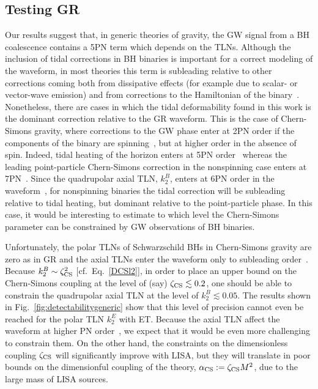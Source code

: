 \documentclass[aps,twocolumn,showpacs,preprintnumbers,nofootinbib,prd,superscriptaddress,groupedaddress,10pt]{revtex4-1}
\begin{document}
\subsection{Testing GR}

Our results suggest that, in generic theories of gravity, the GW signal from a BH coalescence contains a 5PN term which depends on the TLNs. Although the inclusion of tidal corrections in BH binaries is important for a correct modeling of the waveform, in most theories this term is subleading relative to other corrections coming both from dissipative effects (for example due to scalar- or vector-wave emission) and from corrections to the Hamiltonian of the binary~\cite{Yunes:2013dva,Berti:2015itd}.  
%
Nonetheless, there are cases in which the tidal deformability found in this work is the dominant correction relative to the GR waveform. This is the case of Chern-Simons gravity, where corrections to the GW phase enter at 2PN order if the components of the binary are spinning~\cite{Yagi:2012vf}, but at higher order in the absence of spin. Indeed, tidal heating of the horizon enters at 5PN order~\cite{Yagi:2011xp} whereas the leading point-particle Chern-Simons correction in the nonspinning case enters at 7PN~\cite{Yagi:2011xp,Pani:2011xj}. Since the quadrupolar axial TLN, $k_2^B$, enters at 6PN order in the waveform~\cite{Yagi:2013sva}, for nonspinning binaries the tidal correction will be subleading relative to tidal heating, but dominant relative to the point-particle phase. In this case, it would be interesting to estimate to which level the Chern-Simons parameter can be constrained by GW observations of BH binaries.


Unfortunately, the polar TLNs of Schwarzschild BHs in Chern-Simons gravity are zero as in GR and the axial TLNs enter the waveform only to subleading order~\cite{Yagi:2013sva}. Because $k_2^B\sim \zeta_{\rm CS}^2$ [cf.\ Eq.~\eqref{DCSl2}], in order to place an upper bound on the Chern-Simons coupling at the level of (say) $\zeta_{\rm CS}\lesssim 0.2$, one should be able to constrain the quadrupolar axial TLN at the level of $k_2^B\lesssim0.05$. 
%
The results shown in Fig.~\ref{fig:detectabilitygeneric} show that this level of precision cannot even be reached for the polar TLN $k_2^E$ with ET. Because the axial TLN affect the waveform at higher PN order~\cite{Yagi:2013sva}, we expect that it would be even more challenging to constrain them. 
%
On the other hand, the constraints on the dimensionless coupling $\zeta_{\rm CS}$ will significantly improve with LISA, but they will translate in poor bounds on the dimensionful coupling of the theory, $\alpha_{\rm CS}:=\zeta_{\rm CS} M^2$, due to the large mass of LISA sources.
\end{document}
